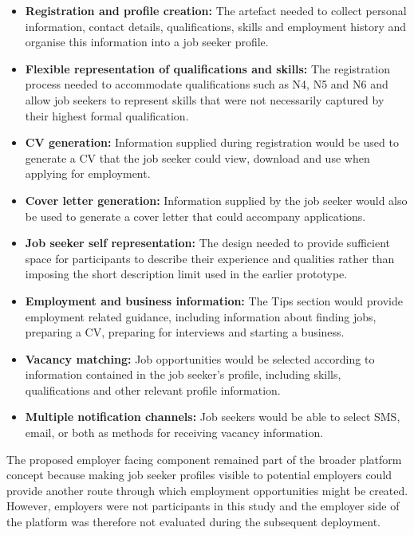 \begin{itemize}

    \item \textbf{Registration and profile creation:}
    The artefact needed to collect personal information, contact details, qualifications, skills and employment history and organise this information into a job seeker profile.

    \item \textbf{Flexible representation of qualifications and skills:}
    The registration process needed to accommodate qualifications such as N4, N5 and N6 and allow job seekers to represent skills that were not necessarily captured by their highest formal qualification.

    \item \textbf{CV generation:}
    Information supplied during registration would be used to generate a CV that the job seeker could view, download and use when applying for employment.

    \item \textbf{Cover letter generation:}
    Information supplied by the job seeker would also be used to generate a cover letter that could accompany applications.

    \item \textbf{Job seeker self representation:}
    The design needed to provide sufficient space for participants to describe their experience and qualities rather than imposing the short description limit used in the earlier prototype.

    \item \textbf{Employment and business information:}
    The Tips section would provide employment related guidance, including information about finding jobs, preparing a CV, preparing for interviews and starting a business.

    \item \textbf{Vacancy matching:}
    Job opportunities would be selected according to information contained in the job seeker's profile, including skills, qualifications and other relevant profile information.

    \item \textbf{Multiple notification channels:}
    Job seekers would be able to select SMS, email, or both as methods for receiving vacancy information.

\end{itemize}

The proposed employer facing component remained part of the broader platform concept because making job seeker profiles visible to potential employers could provide another route through which employment opportunities might be created. However, employers were not participants in this study and the employer side of the platform was therefore not evaluated during the subsequent deployment.


